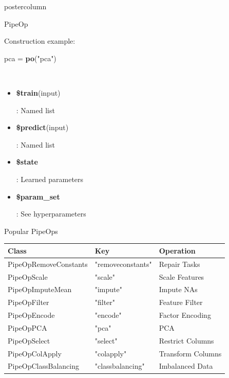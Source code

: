 \documentclass{beamer}
\newcommand{\codeinline}[1]{\begin{codeboxinline}#1\end{codeboxinline}}
\begin{document}
\begin{frame}[fragile]{}
\begin{columns}
\begin{column}{.245\textwidth}
\begin{beamercolorbox}[center]{postercolumn}
\begin{minipage}{.98\textwidth}
{\begin{myblock}{PipeOp}
\begin{center}
              \end{center}
              Construction example: \codeinline{pca = \textbf{po}("pca")}
              \\
              \begin{itemize}
                \item \codeinline{\textbf{\$train}(input)}: Named list
                \item \codeinline{\textbf{\$predict}(input)}: Named list
                \item \codeinline{\textbf{\$state}}: Learned parameters
                \item \codeinline{\textbf{\$param\_set}}: See hyperparameters
              \end{itemize}
            \end{myblock}
            \vspace{-1.0em}
            \begin{myblock}{Popular PipeOps}
              \begin{footnotesize}
                \begin{centering}
                  \begin{tabular}{l l l}
                    \textbf{Class}        & \textbf{Key}      & \textbf{Operation}    \\ \hline
                    PipeOpRemoveConstants & "removeconstants" & Repair Tasks          \\
                    PipeOpScale           & "scale"           & Scale Features        \\
                    PipeOpImputeMean      & "impute"          & Impute NAs            \\
                    PipeOpFilter          & "filter"          & Feature Filter        \\
                    PipeOpEncode          & "encode"          & Factor Encoding       \\
                    PipeOpPCA             & "pca"             & PCA                   \\
                    PipeOpSelect          & "select"          & Restrict Columns      \\
                    PipeOpColApply        & "colapply"        & Transform Columns     \\
                    PipeOpClassBalancing  & "classbalancing"  & Imbalanced Data       \\

\end{tabular}
\end{centering}
\end{footnotesize}
\end{myblock}}
\end{minipage}
\end{beamercolorbox}
\end{column}
\end{columns}
\end{frame}
\end{document}
